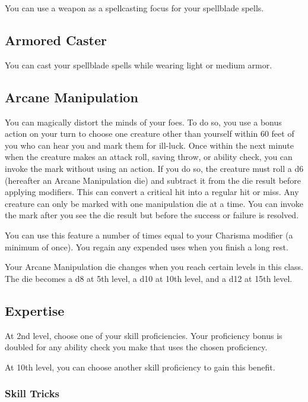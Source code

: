 You can use a weapon as a spellcasting focus for your spellblade spells.

\subsection{Armored Caster}

You can cast your spellblade spells while wearing light or medium armor.

\subsection{Arcane Manipulation}

You can magically distort the minds of your foes. To do so, you use a bonus action on your turn to choose one creature other than yourself within 60 feet of you who can hear you and mark them for ill-luck. Once within the next minute when the creature makes an attack roll, saving throw, or ability check, you can invoke the mark without using an action. If you do so, the creature must roll a d6 (hereafter an Arcane Manipulation die) and subtract it from the die result before applying modifiers. This can convert a critical hit into a regular hit or miss. Any creature can only be marked with one manipulation die at a time. You can invoke the mark after you see the die result but before the success or failure is resolved.

You can use this feature a number of times equal to your Charisma modifier (a minimum of once). You regain any expended uses when you finish a long rest.

Your Arcane Manipulation die changes when you reach certain levels in this class. The die becomes a d8 at 5th level, a d10 at 10th level, and a d12 at 15th level.

\subsection{Expertise}

At 2nd level, choose one of your skill proficiencies. Your proficiency bonus is doubled for any ability check you make that uses the chosen proficiency.

At 10th level, you can choose another skill proficiency to gain this benefit.

\subsubsection{Skill Tricks}

